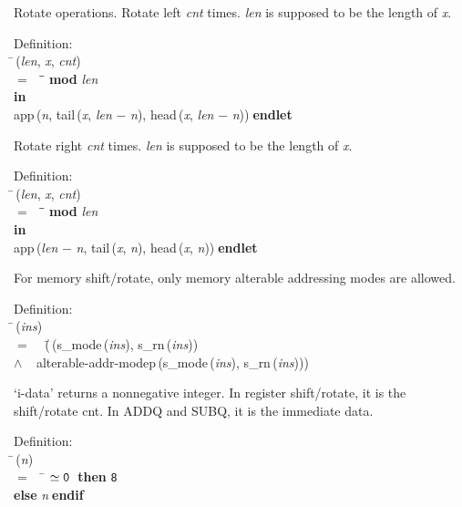  Rotate operations.
 Rotate left {\it{cnt\/}} times.  {\it{len\/}} is supposed to be the length of {\it{x\/}}.
\begin{tabbing}{\sc Definition}: \\  
\=\,({\it{len\/}}, {\it{x\/}}, {\it{cnt\/}}) \\ 
$=$$\;\;\;\;$\=\= ${}${\bf{mod}}${}$ {\it{len\/}}\- \\ 
{\bf in} \\ 
{\rm{app}}\,({\it{n\/}}, {\rm{tail}}\,({\it{x\/}}, {\it{len\/}} $-$ {\it{n\/}}), {\rm{head}}\,({\it{x\/}}, {\it{len\/}} $-$ {\it{n\/}}))$\;${\bf  endlet}\-\-
\end{tabbing}

 Rotate right {\it{cnt\/}} times.  {\it{len\/}} is supposed to be the length of {\it{x\/}}.
\begin{tabbing}{\sc Definition}: \\  
\=\,({\it{len\/}}, {\it{x\/}}, {\it{cnt\/}}) \\ 
$=$$\;\;\;\;$\=\= ${}${\bf{mod}}${}$ {\it{len\/}}\- \\ 
{\bf in} \\ 
{\rm{app}}\,({\it{len\/}} $-$ {\it{n\/}}, {\rm{tail}}\,({\it{x\/}}, {\it{n\/}}), {\rm{head}}\,({\it{x\/}}, {\it{n\/}}))$\;${\bf  endlet}\-\-
\end{tabbing}

 For memory shift/rotate, only memory alterable addressing modes are allowed.
\begin{tabbing}{\sc Definition}: \\  
\=\,({\it{ins\/}}) \\ 
$=$$\;\;\;\;$(\=\,({\rm{s\_mode}}\,({\it{ins\/}}), {\rm{s\_rn}}\,({\it{ins\/}})) \\ 
$\wedge$$\;\;\;\;${\rm{alterable-addr-modep}}\,({\rm{s\_mode}}\,({\it{ins\/}}), {\rm{s\_rn}}\,({\it{ins\/}})))\-\-
\end{tabbing}

 `i-data' returns a nonnegative integer.  In register shift/rotate, it is
 the shift/rotate cnt.  In ADDQ and SUBQ, it is the immediate data.
\begin{tabbing}{\sc Definition}: \\  
\=\,({\it{n\/}}) \\ 
$=$$\;\;\;\;$\= $\simeq {\tt{0}}$$\;\;${\bf then }{\tt{8}} \\ 
{\bf else }{\it{n\/}}$\;${\bf  endif}\-\-
\end{tabbing}

